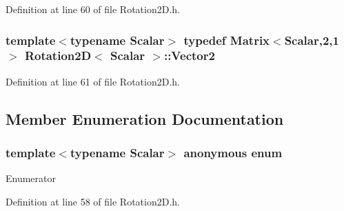 Definition at line 60 of file Rotation2\-D.\-h.

\hypertarget{class_rotation2_d_abdc2e1016e3191a88dc42877fd5a50f0}{
\subsubsection[{Vector2}]{\setlength{\rightskip}{0pt plus 5cm}template$<$typename Scalar$>$ typedef {\bf Matrix}$<${\bf Scalar},2,1$>$ {\bf Rotation2\-D}$<$ {\bf Scalar} $>$\-::{\bf Vector2}}}\label{class_rotation2_d_abdc2e1016e3191a88dc42877fd5a50f0}


Definition at line 61 of file Rotation2\-D.\-h.



\subsection{Member Enumeration Documentation}
\hypertarget{class_rotation2_d_a436a9a68dc8598228f7baffbadfd8ae4}{\subsubsection[{anonymous enum}]{\setlength{\rightskip}{0pt plus 5cm}template$<$typename Scalar$>$ anonymous enum}}\label{class_rotation2_d_a436a9a68dc8598228f7baffbadfd8ae4}
\begin{Desc}
\item[Enumerator]\par
\begin{description}
\item[{\em 
\hypertarget{class_rotation2_d_a436a9a68dc8598228f7baffbadfd8ae4a8747fba98b24f30a84e5437e3157b4b6}{Dim}\label{class_rotation2_d_a436a9a68dc8598228f7baffbadfd8ae4a8747fba98b24f30a84e5437e3157b4b6}
}]\end{description}
\end{Desc}


Definition at line 58 of file Rotation2\-D.\-h.



